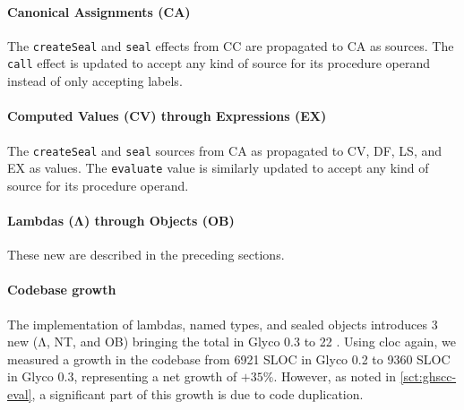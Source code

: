 \documentclass[main.tex]{subfiles}
\begin{document}
\paragraph{Canonical Assignments (CA)} The \texttt{createSeal} and \texttt{seal} effects from CC are propagated to CA as sources. The \texttt{call} effect is updated to accept any kind of source for its procedure operand instead of only accepting labels.

\paragraph{Computed Values (CV) through Expressions (EX)} The \texttt{createSeal} and \texttt{seal} sources from CA as propagated to CV, DF, LS, and EX as values. The \texttt{evaluate} value is similarly updated to accept any kind of source for its procedure operand.

\paragraph{Lambdas (Λ) through Objects (OB)} These new  are described in the preceding sections.

\paragraph{Codebase growth} The implementation of lambdas, named types, and sealed objects introduces 3 new  (Λ, NT, and OB) bringing the total in Glyco 0.3 to 22 . Using cloc again, we measured a growth in the codebase from 6921 SLOC in Glyco 0.2 to 9360 SLOC in Glyco 0.3, representing a net growth of $+35\%$. However, as noted in \cref{sct:ghscc-eval}, a significant part of this growth is due to code duplication.

\onlyinsubfile{\glsaddall\printglossaries}
\end{document}
